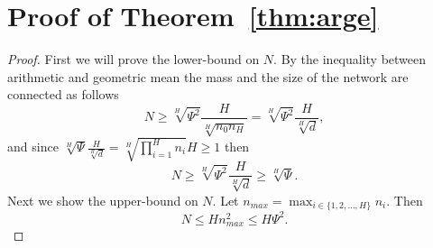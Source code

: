 \documentclass[twoside]{article}
\begin{document}



\clearpage

\toptitlebar 
{\Large \bf  {} \par}
\bottomtitlebar

\section{Proof of Theorem~\ref{thm:arge}}
\begin{proof}
First we will prove the lower-bound on $N$. By the inequality between arithmetic and geometric mean the mass and the size of the network are connected as follows
\[N \geq \sqrt[H]{\Psi^2}\frac{H}{\sqrt[H]{n_0n_H}} = \sqrt[H]{\Psi^2}\frac{H}{\sqrt[H]{d}},
\]
and since $\sqrt[H]{\Psi}\frac{H}{\sqrt[H]{d}} = \sqrt[H]{\prod_{i = 1}^{H}n_i}H \geq 1$ then 
\[N \geq \sqrt[H]{\Psi^2}\frac{H}{\sqrt[H]{d}} \geq \sqrt[H]{\Psi}.
\]
Next we show the upper-bound on $N$. Let $n_{max} = \max_{i \in \{1,2,\dots,H\}}n_i$. Then
\[N \leq Hn_{max}^2 \leq H\Psi^2.
\]
\end{proof}
\end{document}
